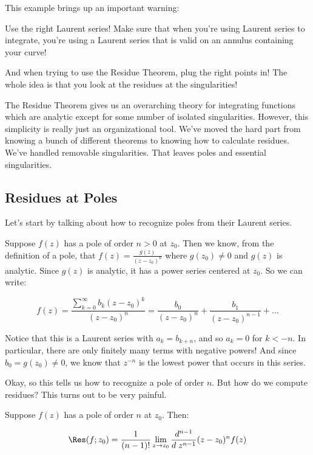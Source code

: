 This example brings up an important warning:

\begin{warn}{}{} Use the right Laurent series! Make sure that when you're using Laurent series to integrate, you're using a Laurent series that is valid on an annulus containing your curve!

\vspace{10pt}

And when trying to use the Residue Theorem, plug the right points in! The whole idea is that you look at the residues at the singularities!
\end{warn}

The Residue Theorem gives us an overarching theory for integrating functions which are analytic except for some number of isolated singularities. However, this simplicity is really just an organizational tool. We've moved the hard part from knowing a bunch of different theorems to knowing how to calculate residues. We've handled removable singularities. That leaves poles and essential singularities.

\subsection{Residues at Poles}

Let's start by talking about how to recognize poles from their Laurent series.

Suppose $f(z)$ has a pole of order $n > 0$ at $z_0$. Then we know, from the definition of a pole, that $f(z) = \frac{g(z)}{(z-z_0)^n}$ where $g(z_0)\ne 0$ and $g(z)$ is analytic. Since $g(z)$ is analytic, it has a power series centered at $z_0$. So we can write:

$$f(z) = \frac{\sum_{k = 0}^\infty b_k(z-z_0)^k}{(z-z_0)^n} = \frac{b_0}{(z-z_0)^n} + \frac{b_1}{(z-z_0)^{n-1}} + \dots$$

Notice that this is a Laurent series with $a_k = b_{k + n}$, and so $a_k = 0$ for $k < -n$. In particular, there are only finitely many terms with negative powers! And since $b_0 = g(z_0)\ne 0$, we know that $z^{-n}$ is the lowest power that occurs in this series.

Okay, so this tells us how to recognize a pole of order $n$. But how do we compute residues? This turns out to be very painful.

\begin{thmbo}{}{} Suppose $f(z)$ has a pole of order $n$ at $z_0$. Then:

$$\Res(f;z_0) = \frac{1}{(n-1)!}\lim_{z\rightarrow z_0} \frac{d^{n-1}}{d\;z^{n-1}} (z-z_0)^nf(z)$$
\end{thmbo}

